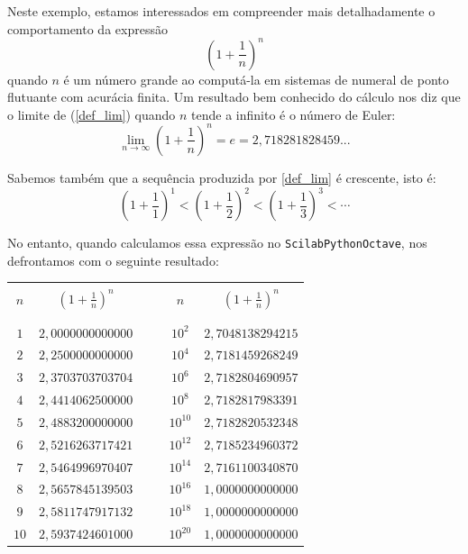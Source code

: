 \begin{ex}\label{ex:cancelamento_euler} Neste exemplo, estamos interessados em compreender mais detalhadamente o comportamento da expressão
\begin{equation*}
  \label{def_lim}\left(1+\frac{1}{n}\right)^n
\end{equation*}
quando $n$ é um número grande ao computá-la em sistemas de numeral de ponto flutuante com acurácia finita.
Um resultado bem conhecido do cálculo nos diz que o limite de (\ref{def_lim}) quando $n$ tende a infinito é o número de Euler:
\begin{equation*}\label{lim}
  \lim_{n\to \infty}\left(1+\frac{1}{n}\right)^n=e= 2,718281828459...
\end{equation*}

Sabemos também que a sequência produzida por \eqref{def_lim} é crescente, isto é:
$$\left(1+\frac{1}{1}\right)^1< \left(1+\frac{1}{2}\right)^2< \left(1+\frac{1}{3}\right)^3 < \cdots $$

No entanto, quando calculamos essa expressão no \ifisscilab\verb+Scilab+\fi\ifispython\verb+Python+\fi\ifisoctave\verb+Octave+\fi, nos defrontamos com o seguinte resultado:
\begin{center}
\begin{tabular}{|c|c|c|c|c|}\hline &&&&\\[-0.3cm]
$n$ & $\left(1+\frac{1}{n}\right)^n$&$~~~~$&$n$ & $\left(1+\frac{1}{n}\right)^n$\\ &&&&\\[-0.3cm]\hline\\[-0.3cm]
$1$ & $2,0000000000000$ && $10^{2}$ & $2,7048138294215$ \\
$2$ & $2,2500000000000$ && $10^{4}$ & $2,7181459268249$ \\
$3$ & $2,3703703703704$ && $10^{6}$ & $2,7182804690957$ \\
$4$ & $2,4414062500000$ && $10^{8}$ & $2,7182817983391$ \\
$5$ & $2,4883200000000$ && $10^{10}$ & $2,7182820532348$ \\
$6$ & $2,5216263717421$ && $10^{12}$ & $2,7185234960372$ \\
$7$ & $2,5464996970407$ && $10^{14}$ & $2,7161100340870$ \\
$8$ & $2,5657845139503$ && $10^{16}$ & $1,0000000000000$ \\
$9$ & $2,5811747917132$ && $10^{18}$ & $1,0000000000000$ \\
$10$ & $2,5937424601000$ && $10^{20}$ & $1,0000000000000$ \\\hline
\end{tabular}  
\end{center}


\end{ex}
